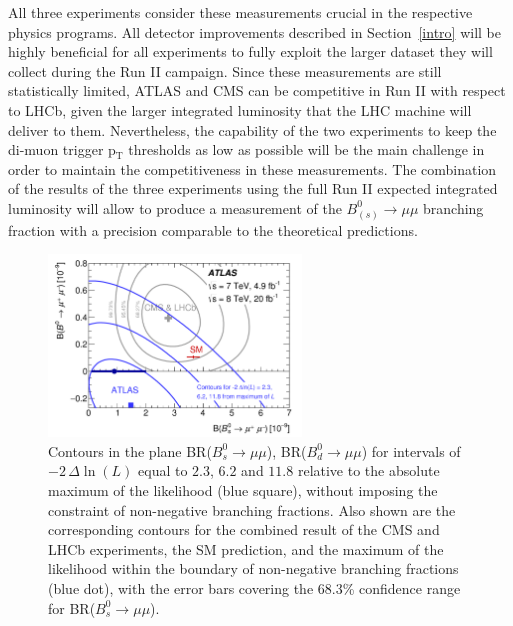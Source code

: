 All three experiments consider these measurements crucial in the respective physics programs. All detector improvements described in Section~\ref{intro} will be highly beneficial for all experiments to fully exploit the larger dataset they will collect during the Run II campaign. 
Since these measurements are still statistically limited, ATLAS and CMS can be competitive in Run II with respect to LHCb, given the larger integrated luminosity that the LHC machine will deliver to them. Nevertheless, the capability of the two experiments to keep the di-muon trigger p$_\mathrm{T}$ thresholds as low as possible will be the main challenge in order to maintain the competitiveness in these measurements. The combination of the results of the three experiments using the full Run II expected integrated luminosity will allow to produce a measurement of the $B^0_{(s)} \to \mu \mu$  branching fraction with a precision comparable to the theoretical predictions.
\begin{figure}[!t]
  \begin{center}
    \includegraphics[width=0.6\textwidth]{fig_09.png}
    \caption
        {Contours in the plane  BR($B^0_s \to \mu \mu$), BR($B^0_d \to \mu \mu$) for intervals of
          $-2\, \Delta \ln(L)$ equal to $2.3$, $6.2$ and $11.8$ relative to the absolute maximum 
          of the likelihood (blue square), without imposing the constraint of non-negative branching fractions. 
          Also shown are the corresponding contours for the combined result of the CMS and LHCb 
          experiments, the SM prediction, and the maximum of the likelihood within the boundary of non-negative 
          branching fractions (blue dot), with the error bars covering the 68.3\% confidence range for BR($B^0_s \to \mu \mu$).}
        \label{fig:BsBd}
  \end{center}
\end{figure}


